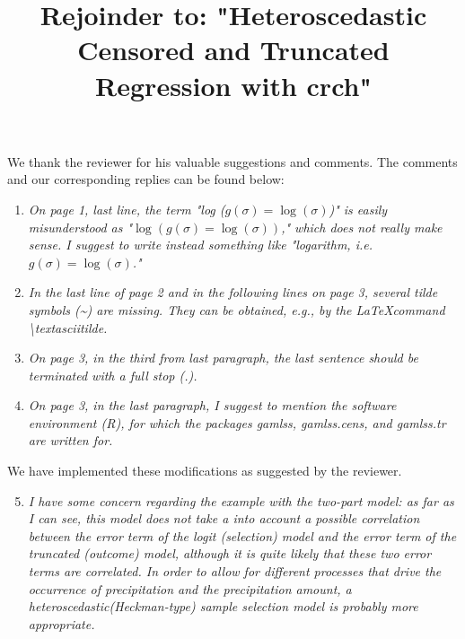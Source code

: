 \documentclass[12pt,a4paper]{article}
\begin{document}
\title{Rejoinder to: "Heteroscedastic Censored and Truncated Regression with crch"}
\maketitle
We thank the reviewer for his valuable suggestions and comments. The comments
and our corresponding replies can be found below:
\begin{enumerate}
  \item \textit{On page 1, last line, the term "log ($g(\sigma) =
  \log(\sigma)$)" is easily misunderstood as "$\log(g(\sigma) =
  \log(\sigma))$," which does not really make sense.  I suggest to write
  instead something like "logarithm, i.e. $g(\sigma) = \log(\sigma)$."} 
  \item \textit{In the last line of page 2 and in the following lines on page
  3, several tilde symbols (\textasciitilde) are missing. They can be obtained,
  e.g., by the \LaTeX command \textbackslash textasciitilde.} 
  \item \textit{On
  page 3, in the third from last paragraph, the last sentence should be
  terminated with a full stop (.).} 
  \item \textit{On page 3, in the last paragraph, I suggest to mention the
  software environment (R), for which the packages gamlss, gamlss.cens, and
  gamlss.tr are written for.}
\end{enumerate}
We have implemented these modifications as suggested by the reviewer.

\begin{enumerate}
  \setcounter{enumi}{4}
  \item \textit{I have some concern regarding the example with the two-part
  model: as far as I can see, this model does not take a into account a
  possible correlation between the error term of the logit (selection) model
  and the error term of the truncated (outcome) model, although it is quite
  likely that these two error terms are correlated. In order to allow for
  different processes that drive the occurrence of precipitation and the
  precipitation amount, a heteroscedastic(Heckman-type) sample selection model
  is probably more appropriate.}
\end{enumerate}
\end{document}
